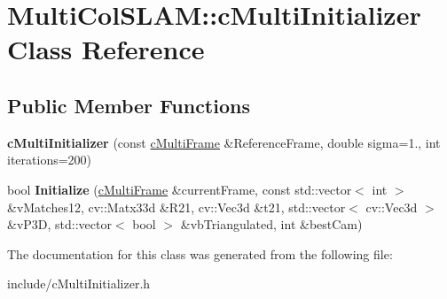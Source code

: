 \hypertarget{classMultiColSLAM_1_1cMultiInitializer}{}\section{Multi\+Col\+S\+L\+AM\+:\+:c\+Multi\+Initializer Class Reference}
\label{classMultiColSLAM_1_1cMultiInitializer}
\subsection*{Public Member Functions}
\begin{DoxyCompactItemize}
\item 
{\bfseries c\+Multi\+Initializer} (const \hyperlink{classMultiColSLAM_1_1cMultiFrame}{c\+Multi\+Frame} \&Reference\+Frame, double sigma=1., int iterations=200)\hypertarget{classMultiColSLAM_1_1cMultiInitializer_a0c2697a76292e8d161b59bc899c46a46}{}\label{classMultiColSLAM_1_1cMultiInitializer_a0c2697a76292e8d161b59bc899c46a46}

\item 
bool {\bfseries Initialize} (\hyperlink{classMultiColSLAM_1_1cMultiFrame}{c\+Multi\+Frame} \&current\+Frame, const std\+::vector$<$ int $>$ \&v\+Matches12, cv\+::\+Matx33d \&R21, cv\+::\+Vec3d \&t21, std\+::vector$<$ cv\+::\+Vec3d $>$ \&v\+P3D, std\+::vector$<$ bool $>$ \&vb\+Triangulated, int \&best\+Cam)\hypertarget{classMultiColSLAM_1_1cMultiInitializer_a863ce7962bec3d3f164c0291a844de04}{}\label{classMultiColSLAM_1_1cMultiInitializer_a863ce7962bec3d3f164c0291a844de04}

\end{DoxyCompactItemize}


The documentation for this class was generated from the following file\+:\begin{DoxyCompactItemize}
\item 
include/c\+Multi\+Initializer.\+h\end{DoxyCompactItemize}

